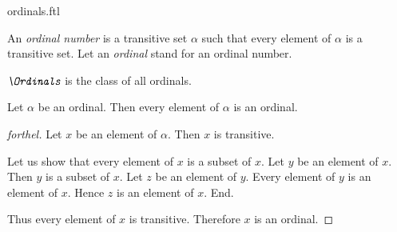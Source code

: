 \documentclass{stex}
\begin{document}
\begin{smodule}{ordinals.ftl}




\begin{definition*}[forthel,for={ordinal number,ordinal}]
  An \emph{ordinal number} is a transitive set $\alpha$ such that every element of $\alpha$ is a transitive set.
  Let an \emph{ordinal} stand for an ordinal number.
\end{definition*}

\begin{definition*}[forthel,for=Ordinals]
  $\emph{\Ordinals}$ is the class of all ordinals.
\end{definition*}

\begin{proposition*}[forthel]
  Let $\alpha$ be an ordinal.
  Then every element of $\alpha$ is an ordinal.
\end{proposition*}
\begin{proof}[forthel]
  Let $x$ be an element of $\alpha$.
  Then $x$ is transitive.

  Let us show that every element of $x$ is a subset of $x$.
    Let $y$ be an element of $x$.
    Then $y$ is a subset of $x$.
    Let $z$ be an element of $y$.
    Every element of $y$ is an element of $x$.
    Hence $z$ is an element of $x$.
  End.

  Thus every element of $x$ is transitive.
  Therefore $x$ is an ordinal.
\end{proof}

\end{smodule}
\end{document}
